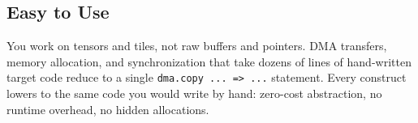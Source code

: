 \subsection*{Easy to Use}

You work on tensors and tiles, not raw buffers and pointers. DMA transfers, memory allocation, and synchronization that take dozens of lines of hand-written target code reduce to a single \texttt{dma.\allowbreak{}copy .\allowbreak{}.\allowbreak{}.\allowbreak{} =\textgreater{} .\allowbreak{}.\allowbreak{}.\allowbreak{}} statement. Every construct lowers to the same code you would write by hand: zero-cost abstraction, no runtime overhead, no hidden allocations.
